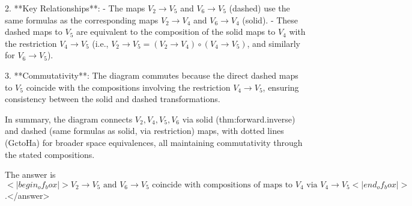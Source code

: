 2. **Key Relationships**:  
   - The maps \( V_2 \to V_5 \) and \( V_6 \to V_5 \) (dashed) use the same formulas as the corresponding maps \( V_2 \to V_4 \) and \( V_6 \to V_4 \) (solid).  
   - These dashed maps to \( V_5 \) are equivalent to the composition of the solid maps to \( V_4 \) with the restriction \( V_4 \to V_5 \) (i.e., \( V_2 \to V_5 = (V_2 \to V_4) \circ (V_4 \to V_5) \), and similarly for \( V_6 \to V_5 \)).  

3. **Commutativity**:  
   The diagram commutes because the direct dashed maps to \( V_5 \) coincide with the compositions involving the restriction \( V_4 \to V_5 \), ensuring consistency between the solid and dashed transformations.  

In summary, the diagram connects \( V_2, V_4, V_5, V_6 \) via solid (thm:forward.inverse) and dashed (same formulas as solid, via restriction) maps, with dotted lines (GctoHa) for broader space equivalences, all maintaining commutativity through the stated compositions.  

The answer is \(<|begin_of_box|>V_2 \to V_5 \text{ and } V_6 \to V_5 \text{ coincide with compositions of maps to } V_4 \text{ via } V_4 \to V_5<|end_of_box|>\).</answer>